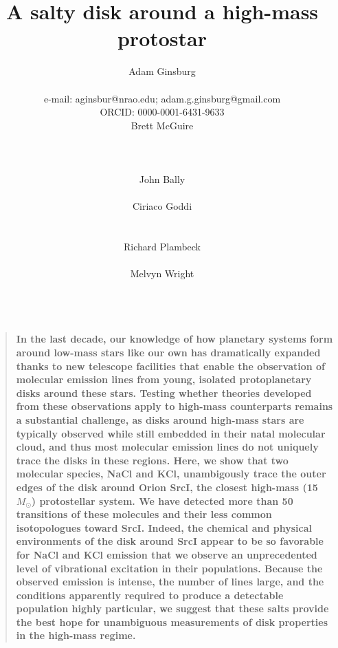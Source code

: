 \documentclass[12pt]{article}
\date{}
\author{
Adam Ginsburg\\
\nraojansky\\
e-mail: aginsbur@nrao.edu; adam.g.ginsburg@gmail.com\\
ORCID: 0000-0001-6431-9633 \\
Brett McGuire\\
\hubble\\
\nraocv\\
\cfa\\
John Bally\\
\casa\\
Ciriaco Goddi\\
\allegro\\
\radboud\\
Richard Plambeck\\
\berkeley\\
Melvyn Wright\\
\berkeley\\
}
\title{A salty disk around a high-mass protostar}
\newenvironment{sciabstract}{%
\begin{quote} \bf  }
{\end{quote}}
\newcommand{\sourcei}{SrcI\xspace}
\newcommand{\msun}{\ensuremath{M_{\odot}}\xspace}			%
\begin{document}


\maketitle

\begin{sciabstract}
 In the last decade, our knowledge of how planetary systems form around
 low-mass stars like our own has dramatically expanded thanks to new telescope
 facilities that enable the observation of molecular emission lines from young,
 isolated protoplanetary disks around these stars.  Testing whether theories
 developed from these observations apply to high-mass counterparts remains a
 substantial challenge, as disks around high-mass stars are typically observed
 while still embedded in their natal molecular cloud, and thus most molecular
 emission lines do not uniquely trace the disks in these regions. Here, we show
 that two molecular species, NaCl and KCl, unambigously trace the outer edges
 of the disk around Orion \sourcei, the closest high-mass (15~\msun)
 protostellar system.  We have detected more than 50 transitions of these
 molecules and their less common isotopologues toward \sourcei.  Indeed, the
 chemical and physical environments of the disk around \sourcei appear to be so
 favorable for NaCl and KCl emission that we observe an unprecedented level of
 vibrational excitation in their populations.  Because the observed emission is
 intense, the number of lines large, and the conditions apparently required to
 produce a detectable population highly particular, we suggest that these salts
 provide the best hope for unambiguous measurements of disk properties in the
 high-mass regime. 
\end{sciabstract}


 
\end{document}
